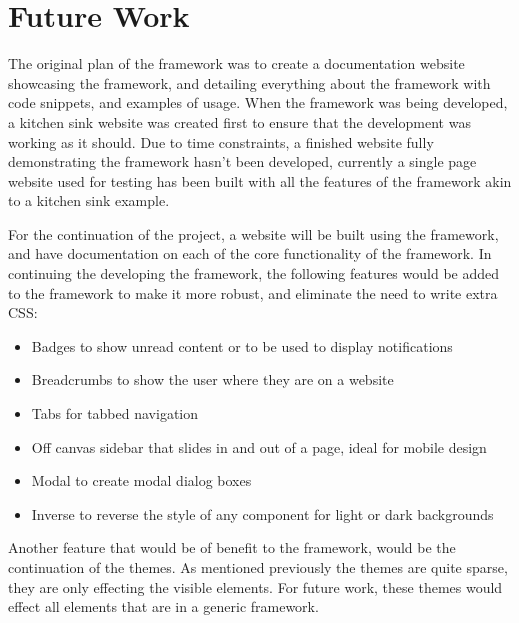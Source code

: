 \newpage
\chapter*{Future Work}


The original plan of the framework was to create a documentation website showcasing the framework, and detailing everything about the framework with code snippets, and examples of usage. When the framework was being developed, a kitchen sink website was created first to ensure that the development was working as it should. Due to time constraints, a finished website fully demonstrating the framework hasn't been developed, currently a single page website used for testing has been built with all the features of the framework akin to a kitchen sink example. 

For the continuation of the project, a website will be built using the framework, and have documentation on each of the core functionality of the framework. In continuing the developing the framework, the following features would be added to the framework to make it more robust, and eliminate the need to write extra \gls{CSS}:
\begin{itemize}
	\item Badges to show unread content or to be used to display notifications
	\item Breadcrumbs to show the user where they are on a website
	\item Tabs for tabbed navigation
	\item Off canvas sidebar that slides in and out of a page, ideal for mobile design
	\item Modal to create modal dialog boxes
	\item Inverse to reverse the style of any component for light or dark backgrounds
\end{itemize}

Another feature that would be of benefit to the framework, would be the continuation of the themes. As mentioned previously the themes are quite sparse, they are only effecting the visible elements. For future work, these themes would effect all elements that are in a generic framework. 

